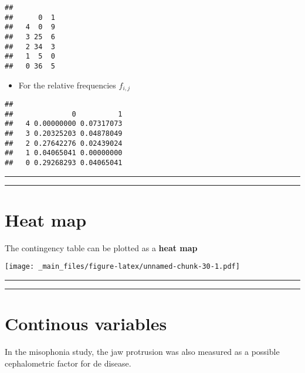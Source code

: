 \documentclass[
]{book}
\providecommand{\tightlist}{%
  \setlength{\itemsep}{0pt}\setlength{\parskip}{0pt}}
\begin{document}
\begin{verbatim}
##    
##      0  1
##   4  0  9
##   3 25  6
##   2 34  3
##   1  5  0
##   0 36  5
\end{verbatim}

\begin{itemize}
\tightlist
\item
  For the relative frequencies \(f_{i,j}\)
\end{itemize}

\begin{verbatim}
##    
##              0          1
##   4 0.00000000 0.07317073
##   3 0.20325203 0.04878049
##   2 0.27642276 0.02439024
##   1 0.04065041 0.00000000
##   0 0.29268293 0.04065041
\end{verbatim}

\begin{center}\rule{0.5\linewidth}{0.5pt}\end{center}

\begin{center}\rule{0.5\linewidth}{0.5pt}\end{center}

\hypertarget{heat-map}{%
\section{Heat map}\label{heat-map}}

The contingency table can be plotted as a \textbf{heat map}

\texttt{[image: \_main\_files/figure-latex/unnamed-chunk-30-1.pdf]}

\begin{center}\rule{0.5\linewidth}{0.5pt}\end{center}

\begin{center}\rule{0.5\linewidth}{0.5pt}\end{center}

\hypertarget{continous-variables}{%
\section{Continous variables}\label{continous-variables}}

In the misophonia study, the jaw protrusion was also measured as a possible cephalometric factor for de disease.
\end{document}

